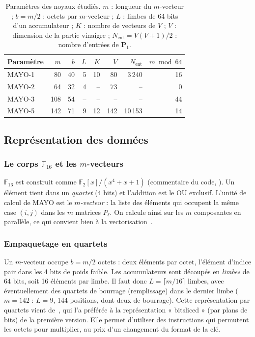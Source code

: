 \begin{table}[ht]\centering\small
\caption{Paramètres des noyaux étudiés. $m$ : longueur du $m$-vecteur ; $b=m/2$ : octets par $m$-vecteur ; $L$ : limbes de 64 bits d'un accumulateur ; $K$ : nombre de vecteurs de $V$ ; $V$ : dimension de la partie vinaigre ; $N_{\mathrm{ent}}=V(V+1)/2$ : nombre d'entrées de $\mathbf{P}_1$.}\label{tab:params}
\begin{tabular}{@{}lrrrrrrr@{}}\toprule
Paramètre & $m$ & $b$ & $L$ & $K$ & $V$ & $N_{\mathrm{ent}}$ & $m \bmod 64$\\\midrule
MAYO-1 & 80 & 40 & 5 & 10 & 80 & 3\,240 & 16\\
MAYO-2 & 64 & 32 & 4 & -- & 73 & -- & 0\\
MAYO-3 & 108 & 54 & -- & -- & -- & -- & 44\\
MAYO-5 & 142 & 71 & 9 & 12 & 142 & 10\,153 & 14\\\bottomrule
\end{tabular}
\end{table}

\subsection{Représentation des données}\label{sec:repr}
\subsubsection{Le corps $\mathbb{F}_{16}$ et les $m$-vecteurs}
$\mathbb{F}_{16}$ est construit comme $\mathbb{F}_2[x]/(x^4+x+1)$ (commentaire du code, ). Un élément tient dans un \emph{quartet} (4 bits) et l'addition est le OU exclusif. L'unité de calcul de MAYO est le \emph{$m$-vecteur} : la liste des éléments qui occupent la même case $(i,j)$ dans les $m$ matrices $P_\ell$. On calcule ainsi sur les $m$ composantes en parallèle, ce qui convient bien à la vectorisation~\cite{nibbling}.

\subsubsection{Empaquetage en quartets}
Un $m$-vecteur occupe $b=m/2$ octets : deux éléments par octet, l'élément d'indice pair dans les 4 bits de poids faible. Les accumulateurs sont découpés en \emph{limbes} de 64 bits, soit 16 éléments par limbe. Il faut donc $L=\lceil m/16\rceil$ limbes, avec éventuellement des quartets de bourrage (remplissage) dans le dernier limbe ($m=142$ : $L=9$, 144 positions, dont deux de bourrage). Cette représentation par quartets vient de~\cite{nibbling}, qui l'a préférée à la représentation « bitsliced » (par plans de bits) de la première version. Elle permet d'utiliser des instructions qui permutent les octets pour multiplier, au prix d'un changement du format de la clé.

